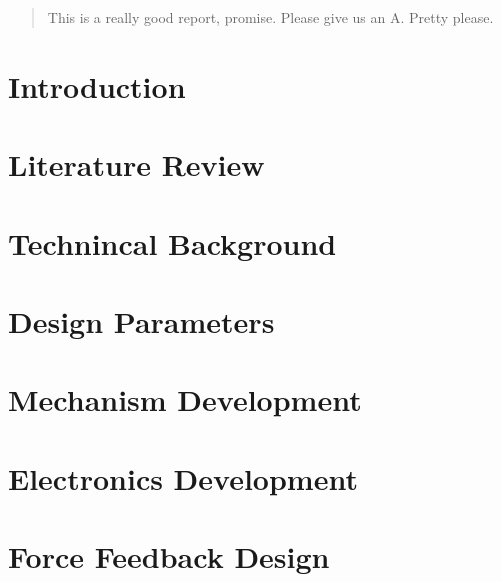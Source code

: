 \documentclass[12pt, fleqn]{report}
\begin{document}
\begingroup
\thispagestyle{empty}

\endgroup


\begin{abstract}
This is a really good report, promise. Please give us an A. Pretty please.
\end{abstract}

\usechapterimagefalse


\printnomenclature


\pagestyle{empty}
\tableofcontents
\pagestyle{fancy}

\usechapterimagetrue
{}

\chapter{Introduction}\label{cha:introduction}


\chapter{Literature Review}\label{cha:lit_review}


\chapter{Technincal Background}\label{cha:tech_background}


\chapter{Design Parameters}\label{cha:design_params}


\chapter{Mechanism Development}\label{cha:mechanism_dev}


\chapter{Electronics Development}\label{cha:electronics_dev}


\chapter{Force Feedback Design}\label{cha:force_feedback}

\end{document}
